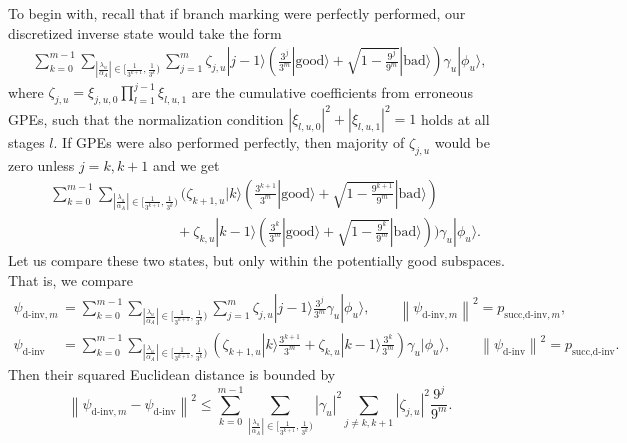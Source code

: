\documentclass[letterpaper,onecolumn,11pt,accepted=2026-02-14]{quantumarticle}
\newcommand{\abs}[1]{\left\lvert#1\right\rvert}
\newcommand{\norm}[1]{\left\lVert#1\right\rVert}
\theoremstyle{remark}
\theoremstyle{plain}
\newcommand{\ket}[1]{|#1\rangle}
\begin{document}
To begin with, recall that if branch marking were perfectly performed, our discretized inverse state would take the form
\begin{equation}
\begin{aligned}
    \sum_{k=0}^{m-1}\sum_{\abs{\frac{\lambda_u}{\alpha_A}}\in\big[\frac{1}{3^{k+1}},\frac{1}{3^k}\big)}
    \sum_{j=1}^m
    \zeta_{j,u}
    \ket{j-1}\left(\frac{3^{j}}{3^m}\ket{\mathrm{good}}+\sqrt{1-\frac{9^{j}}{9^m}}\ket{\mathrm{bad}}\right)
    \gamma_u\ket{\phi_u},
\end{aligned}
\end{equation}
where $\zeta_{j,u}=\xi_{j,u,0}\prod_{l=1}^{j-1}\xi_{l,u,1}$ are the cumulative coefficients from erroneous GPEs, such that the normalization condition $\abs{\xi_{l,u,0}}^2+\abs{\xi_{l,u,1}}^2=1$ holds at all stages $l$. If GPEs were also performed perfectly, then majority of $\zeta_{j,u}$ would be zero unless $j=k,k+1$ and we get
\begin{equation}
\begin{aligned}
    &\sum_{k=0}^{m-1}\sum_{\abs{\frac{\lambda_u}{\alpha_A}}\in\big[\frac{1}{3^{k+1}},\frac{1}{3^k}\big)}
    \Bigg(\zeta_{k+1,u}
    \ket{k}\left(\frac{3^{k+1}}{3^m}\ket{\mathrm{good}}+\sqrt{1-\frac{9^{k+1}}{9^m}}\ket{\mathrm{bad}}\right)\\
    &\qquad\qquad\qquad\qquad\quad
    +\zeta_{k,u}
    \ket{k-1}\left(\frac{3^{k}}{3^m}\ket{\mathrm{good}}+\sqrt{1-\frac{9^{k}}{9^m}}\ket{\mathrm{bad}}\right)\Bigg)
    \gamma_u\ket{\phi_u}.
\end{aligned}
\end{equation}
Let us compare these two states, but only within the potentially good subspaces. That is, we compare
\begin{equation}
\begin{aligned}
    \psi_{\text{d-inv},m}&=\sum_{k=0}^{m-1}\sum_{\abs{\frac{\lambda_u}{\alpha_A}}\in\big[\frac{1}{3^{k+1}},\frac{1}{3^k}\big)}
    \sum_{j=1}^m
    \zeta_{j,u}
    \ket{j-1}\frac{3^{j}}{3^m}
    \gamma_u\ket{\phi_u},\qquad
    \norm{\psi_{\text{d-inv},m}}^2=p_{\text{succ,d-inv},m},\\
    \psi_{\text{d-inv}}&=\sum_{k=0}^{m-1}\sum_{\abs{\frac{\lambda_u}{\alpha_A}}\in\big[\frac{1}{3^{k+1}},\frac{1}{3^k}\big)}
    \left(\zeta_{k+1,u}
    \ket{k}\frac{3^{k+1}}{3^m}
    +\zeta_{k,u}
    \ket{k-1}\frac{3^{k}}{3^m}\right)
    \gamma_u\ket{\phi_u},\qquad
    \norm{\psi_{\text{d-inv}}}^2=p_{\text{succ,d-inv}}.
\end{aligned}
\end{equation}
Then their squared Euclidean distance is bounded by
\begin{equation}
    \norm{\psi_{\text{d-inv},m}-\psi_{\text{d-inv}}}^2
    \leq\sum_{k=0}^{m-1}\sum_{\abs{\frac{\lambda_u}{\alpha_A}}\in\big[\frac{1}{3^{k+1}},\frac{1}{3^k}\big)}\abs{\gamma_u}^2\sum_{j\neq k,k+1}\abs{\zeta_{j,u}}^2\frac{9^j}{9^m}.
\end{equation}
\end{document}
